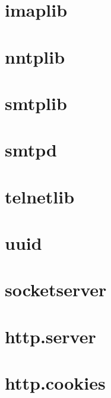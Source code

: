 \section{imaplib}






\section{nntplib}






\section{smtplib}






\section{smtpd}






\section{telnetlib}






\section{uuid}






\section{socketserver}






\section{http.server}






\section{http.cookies}






